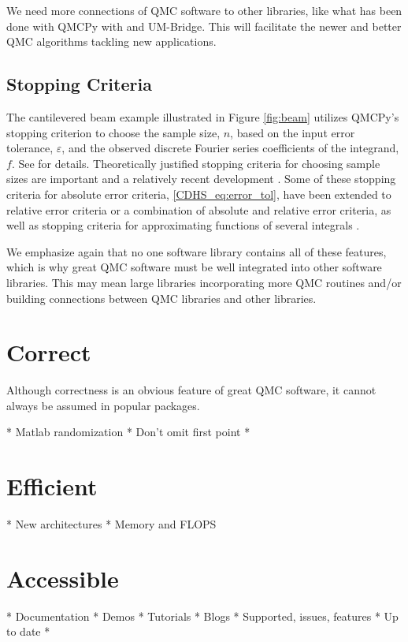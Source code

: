 \documentclass[graybox]{svmult}
\begin{document}
We need more connections of QMC software to other libraries, like what has been done with  QMCPy with and UM-Bridge.  This will facilitate the newer and better QMC algorithms tackling new applications.

\subsection{Stopping Criteria}
The cantilevered beam example illustrated in Figure \ref{fig:beam} utilizes QMCPy's stopping criterion to choose the sample size, $n$, based on the input error tolerance, $\varepsilon$, and the observed discrete Fourier series coefficients of the integrand, $f$.  See \cite{HicJim16a} for details.  Theoretically justified stopping criteria for choosing sample sizes are important and a relatively recent development \cite{HicEtal14a,HicJim16a,JimHic16a,RatHic19a,JagHic22a}.  Some of these stopping criteria for absolute error criteria, \eqref{CDHS_eq:error_tol},  have been extended to relative error criteria or a combination of absolute and relative error criteria, as well as stopping criteria for approximating functions of several integrals \cite{Jia16a,GilJim16b,HicEtal17a,JagSor23a}.

We emphasize again that no one software library contains all of these features, which is why great QMC software must be well integrated into other software libraries.  This may mean large libraries incorporating more QMC routines and/or building connections between QMC libraries and other libraries.


\section{Correct} \label{CDHS_sec:correct}
Although correctness is an obvious feature of great QMC software, it cannot always be assumed in popular packages.  



* Matlab randomization
* Don't omit first point
*


\section{Efficient} \label{CDHS_sec:efficient}
* New architectures
* Memory and FLOPS

\section{Accessible} \label{CDHS_sec:accessible}
* Documentation
* Demos
* Tutorials
* Blogs
* Supported, issues, features
* Up to date
*
\end{document}
